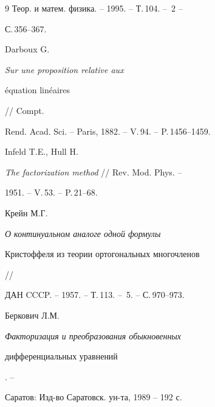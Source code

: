 \begin{thebibliography}{9}
Теор. и матем. физика. -- 1995. -- Т.\,104. -- \No\,2 --


С.\,356--367.




Darboux G. {\it Sur une proposition relative aux


\'equation lin\'eaires} // Compt.


Rend. Acad. Sci. -- Paris, 1882. -- V.\,94. -- P.\,1456--1459.




Infeld T.E., Hull H.


{\it The factorization method} // Rev. Mod. Phys. --


1951. -- V.\,53. -- P.\,21--68.




Крейн М.Г. {\it О континуальном аналоге одной формулы


Кристоффеля из теории ортогональных многочленов} //


ДАН CCCP. -- 1957. -- Т.\,113. -- \No\,5. -- С.\,970--973.




Беркович Л.М. {\it Факторизация и преобразования обыкновенных


дифференциальных уравнений}. --


Саратов: Изд-во Саратовск. ун-та, 1989 -- 192 с.





\end{thebibliography}





\vskip 1cm














\label{end}








